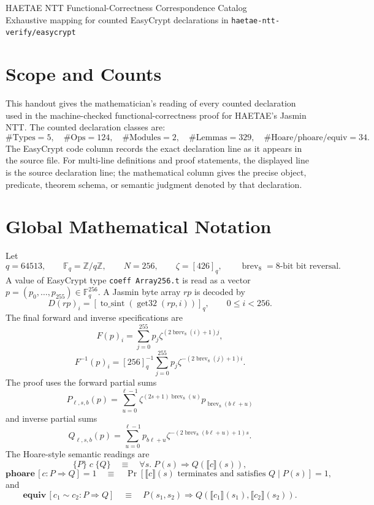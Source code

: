 \documentclass[10pt]{article}
\newcommand{\EC}[1]{\texttt{#1}}
\newcommand{\Fq}{\mathbb F_q}
\newcommand{\brev}{\operatorname{brev}}
\begin{document}
\begin{center}
{\Large HAETAE NTT Functional-Correctness Correspondence Catalog}\\[3pt]
{\small Exhaustive mapping for counted EasyCrypt declarations in \EC{haetae-ntt-verify/easycrypt}}
\end{center}

\section*{Scope and Counts}
This handout gives the mathematician's reading of every counted declaration used
in the machine-checked functional-correctness proof for HAETAE's Jasmin NTT.
The counted declaration classes are:
\[
\#\mathrm{Types}=5,\quad
\#\mathrm{Ops}=124,\quad
\#\mathrm{Modules}=2,\quad
\#\mathrm{Lemmas}=329,\quad
\#\mathrm{Hoare/phoare/equiv}=34.
\]
The EasyCrypt code column records the exact declaration line as it appears in
the source file.  For multi-line definitions and proof statements, the displayed
line is the source declaration line; the mathematical column gives the precise
object, predicate, theorem schema, or semantic judgment denoted by that
declaration.

\section*{Global Mathematical Notation}
Let
\[
q=64513,\qquad \Fq=\mathbb Z/q\mathbb Z,\qquad
N=256,\qquad \zeta=[426]_q,\qquad \brev_8=\text{8-bit bit reversal}.
\]
A value of EasyCrypt type \EC{coeff Array256.t} is read as a vector
$p=(p_0,\ldots,p_{255})\in\Fq^{256}$.  A Jasmin byte array $rp$ is decoded by
\[
D(rp)_i=\left[\operatorname{to\_sint}\!\left(\operatorname{get32}(rp,i)\right)\right]_q,
\qquad 0\le i<256.
\]
The final forward and inverse specifications are
\[
F(p)_i=\sum_{j=0}^{255}p_j\zeta^{(2\brev_8(i)+1)j},
\]
\[
F^{-1}(p)_i=[256]_q^{-1}\sum_{j=0}^{255}
p_j\zeta^{-(2\brev_8(j)+1)i}.
\]
The proof uses the forward partial sums
\[
P_{\ell,s,b}(p)=\sum_{u=0}^{\ell-1}
\zeta^{(2s+1)\brev_8(u)}p_{\brev_8(b\ell+u)}
\]
and inverse partial sums
\[
Q_{\ell,s,b}(p)=\sum_{u=0}^{\ell-1}
p_{b\ell+u}\zeta^{-(2\brev_8(b\ell+u)+1)s}.
\]
The Hoare-style semantic readings are
\[
\{P\}\;c\;\{Q\}\quad\equiv\quad
\forall s.\;P(s)\Rightarrow Q(\llbracket c\rrbracket(s)),
\]
\[
\mathbf{phoare}\,[c:P\Rightarrow Q]=1
\quad\equiv\quad
\Pr[\llbracket c\rrbracket(s)\text{ terminates and satisfies }Q\mid P(s)]=1,
\]
and
\[
\mathbf{equiv}\,[c_1\sim c_2:P\Rightarrow Q]
\quad\equiv\quad
P(s_1,s_2)\Rightarrow
Q(\llbracket c_1\rrbracket(s_1),\llbracket c_2\rrbracket(s_2)).
\]
\end{document}
